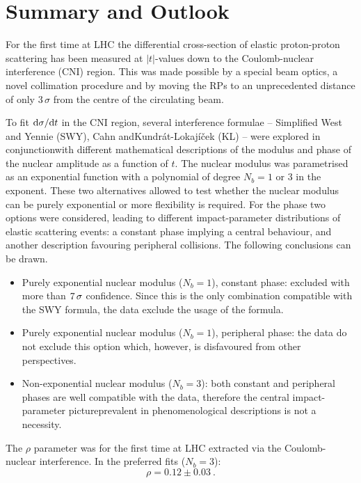 \section{Summary and Outlook}
\label{sec:summary}

\iffalse

For the first time at LHC the differential cross-section of elastic proton-proton scattering has been measured at $|t|$-values down to the Coulomb-nuclear interference (CNI) region. This was made possible by a special beam optics, a novel collimation procedure and by moving the RPs to an unprecedented distance of only $3\,\sigma$ from the centre of the circulating beam.

To fit ${\rm d}\sigma/{\rm d} t$ in the CNI region, several interference formulae -- Simplified West and Yennie (SWY), Cahn and\Break Kundr\' at-Lokaj\' i\v cek (KL) -- were explored in conjunction\Break with different mathematical descriptions of the modulus and phase of the nuclear amplitude as a function of $t$. The nuclear modulus was parametrised as an exponential function with a polynomial of degree $N_b=1$ or $3$ in the exponent. These two alternatives allowed to test whether the nuclear modulus can be purely exponential or more flexibility is required. For the phase two options were considered, leading to different impact-parameter distributions of elastic scattering events: a constant phase implying a central behaviour, and another description favouring peripheral collisions. The following conclusions can be drawn.
\begin{itemize}
\item Purely exponential nuclear modulus ($N_b=1$), constant phase: excluded with more than $7\,{\rm \sigma}$ confidence. Since this is the only combination compatible with the SWY formula, the data exclude the usage of the formula.
\item Purely exponential nuclear modulus ($N_b=1$), peripheral phase: the data do not exclude this option which, however, is disfavoured from other perspectives.
\item Non-exponential nuclear modulus ($N_b=3$): both constant and peripheral phases are well compatible with the data, therefore the central impact-parameter picture\Break prevalent in phenomenological descriptions is not a necessity.
\end{itemize}

The $\rho$ parameter was for the first time at LHC extracted via the Coulomb-nuclear interference. In the preferred fits ($N_b=3$):
\begin{equation}
\label{eq:rho final}
\rho = 0.12 \pm 0.03\ .
\end{equation}

